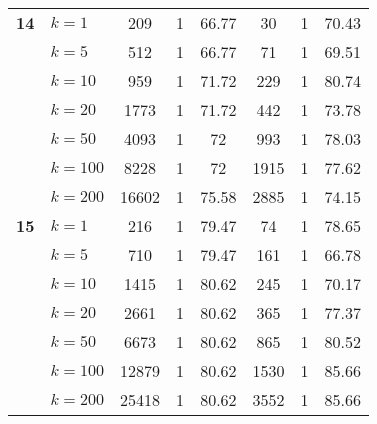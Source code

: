 \begin{table}[htbp]
\begin{tabular}{|l|l|c|c|c|c|c|c|}
    \multicolumn{1}{|r|}{\textbf{14}} & $k=1$ & 209 & 1 & 66.77 & 30 & 1 & 70.43 \\ 
     & $k=5$ & 512 & 1 & 66.77 & 71 & 1 & 69.51 \\ 
     & $k=10$ & 959 & 1 & 71.72 & 229 & 1 & 80.74 \\ 
     & $k=20$ & 1773 & 1 & 71.72 & 442 & 1 & 73.78 \\ 
     & $k=50$ & 4093 & 1 & 72 & 993 & 1 & 78.03 \\ 
     & $k=100$ & 8228 & 1 & 72 & 1915 & 1 & 77.62 \\ 
     & $k=200$ & 16602 & 1 & 75.58 & 2885 & 1 & 74.15 \\ \hline
    \multicolumn{1}{|r|}{\textbf{15}} & $k=1$ & 216 & 1 & 79.47 & 74 & 1 & 78.65 \\ 
     & $k=5$ & 710 & 1 & 79.47 & 161 & 1 & 66.78 \\ 
     & $k=10$ & 1415 & 1 & 80.62 & 245 & 1 & 70.17 \\ 
     & $k=20$ & 2661 & 1 & 80.62 & 365 & 1 & 77.37 \\ 
     & $k=50$ & 6673 & 1 & 80.62 & 865 & 1 & 80.52 \\ 
     & $k=100$ & 12879 & 1 & 80.62 & 1530 & 1 & 85.66 \\ 
     & $k=200$ & 25418 & 1 & 80.62 & 3552 & 1 & 85.66 \\ \hline
    \end{tabular}
\end{table}
